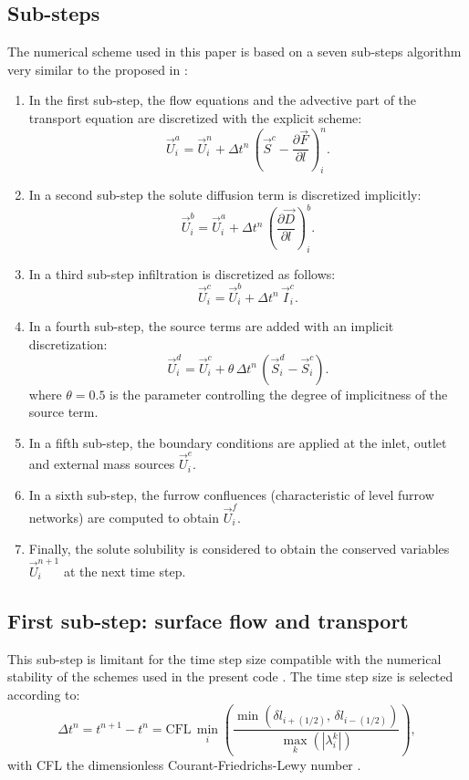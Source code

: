 \documentclass[review,authoryear]{elsarticle}
\newcommand{\eq}[2]{\begin{equation}\label{#2}#1\end{equation}}
\newcommand{\PARTIAL}[2] {\frac{\partial#1}{\partial#2}}
\newcommand{\PA}[1] {\left(#1\right)}
\newcommand{\ABS}[1] {\left|#1\right|}
\newcommand{\IR}{_{i+(1/2)}}
\newcommand{\IL}{_{i-(1/2)}}
\begin{document}
\subsection{Sub-steps}

The numerical scheme used in this paper is based on a seven sub-steps algorithm
very similar to the proposed in \cite{JaviSurcos1}:
\begin{enumerate}
\item In the first sub-step, the flow equations and the advective part of the
transport equation are discretized with the explicit scheme:
\eq
{\vec{U}_i^a=\vec{U}_i^n+\Delta t^n\,\PA{\vec{S}^c-\PARTIAL{\vec{F}}{l}}_i^n.}
{EqSolvA}
\item In a second sub-step the solute diffusion term is discretized implicitly:
\eq{\vec{U}_i^b=\vec{U}_i^a+\Delta t^n\,\PA{\PARTIAL{\vec{D}}{l}}_i^b.}{EqSolvB}
\item In a third sub-step infiltration is discretized as follows:
\eq{\vec{U}_i^c=\vec{U}_i^b+\Delta t^n\,\vec{I}_i^c.}{EqSolvC}
\item In a fourth sub-step, the source terms are added with an implicit
discretization:
\eq{\vec{U}_i^d=\vec{U}_i^c+\theta\,\Delta t^n\,\PA{\vec{S}_i^d-\vec{S}_i^c}.}
{EqSolvD}
where $\theta=0.5$ is the parameter controlling the degree of implicitness of
the source term.
\item In a fifth sub-step, the boundary conditions are applied at the inlet,
outlet and external mass sources $\vec{U}_i^e$.
\item In a sixth sub-step, the furrow confluences (characteristic of level
furrow networks) are computed to obtain $\vec{U}_i^f$.
\item Finally, the solute solubility is considered to obtain the conserved
variables $\vec{U}_i^{n+1}$ at the next time step.
\end{enumerate}

\subsection{First sub-step: surface flow and transport}

This sub-step is limitant for the time step size compatible with the numerical
stability of the schemes used in the present code \citep{JaviSurcos1}. The time
step size is selected according to:
\eq
{
	\Delta t^n=t^{n+1}-t^n=\mathrm{CFL}\,
	\min_i\PA{\frac{\min\PA{\delta l\IR,\,\delta l\IL}}
	{\max_k\PA{\ABS{\lambda_i^k}}}},
}{EqCFL}
with CFL the dimensionless Courant-Friedrichs-Lewy number \citep{CFL}.
\end{document}

